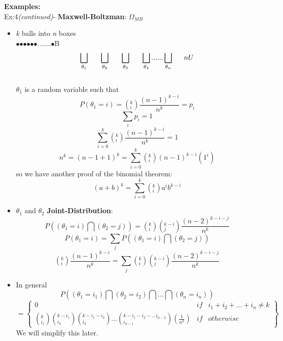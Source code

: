 {\Large\bf Examples:}
\\
Ex:4{\it (continued)}- {\bf Maxwell-Boltzman}: $\Omega_{MB}$\newline
\begin{itemize}
\item {\it k} balls into {\it n} boxes\\
$\bullet$\indent $\bullet$\indent $\bullet$\indent $\bullet$\indent $\bullet$\indent $\bullet$.......$\bullet$B\\
\begin{displaymath}\bigsqcup_{\theta_1}\indent \bigsqcup_{\theta_2}\indent \bigsqcup_{\theta_3}\indent \bigsqcup_{\theta_4}......\bigsqcup_{\theta_n}\indent nU\end{displaymath}\\
$\theta_1$ is a random variable such that 
\begin{displaymath}P(\theta_1=i)=(^k_i)\frac{(n-1)^{k-i}}{n^k}= p_i\end{displaymath}
\begin{displaymath}\sum_ip_i=1\end{displaymath}
\begin{displaymath}\sum_{i=0}^k(^k_i)\frac{(n-1)^{k-i}}{n^k}=1\end{displaymath}
\begin{displaymath}n^k = (n-1+1)^k= \sum_{i=0}^k (^k_i)(n-1)^{k-i} (1^i)\end{displaymath}
so we have another proof of the binomial theorem:
\begin{displaymath}(a+b)^k=\sum_{i=0}^k(^k_i)a^ib^{k-i}\end{displaymath}
\item $\theta_1$ and $\theta_2$ {\bf Joint-Distribution}:
\begin{displaymath}P((\theta_1=i)\bigcap(\theta_2=j))=
(^k_i)(^{k-i}_j)\frac{(n-2)^{k-i-j}}{n^k}\end{displaymath}
\begin{displaymath}P(\theta_1=i)=\sum_jP((\theta_1=i)\bigcap(\theta_2=j))\end{displaymath}
\begin{displaymath}(^k_i)\frac{(n-1)^{k-i}}{n^k}=\sum_j(^k_i)(^{k-i}_j)\frac{(n-2)^{k-i-j}}{n^k}\end{displaymath}
\item In general
\begin{displaymath}P((\theta_1=i_1)\bigcap(\theta_2=i_2)\bigcap...\bigcap(\theta_n=i_n))\end{displaymath}
\begin{displaymath}
=\left\{
\begin {array}{rcl} 
0 & if & i_1+i_2+...+i_n\neq k\\
(^k_{i_1})(^{k-{i_1}}_{i_2})(^{k-{i_1}-{i_2}}_{i_3})...(^{k-{i_1}-{i_2}-...{i_{
n-2}}}_{i_{n-1}})(\frac{1}{n^k}) & if & otherwise
\end{array} \right\}
\end{displaymath}
We will simplify this later.
\end{itemize}















